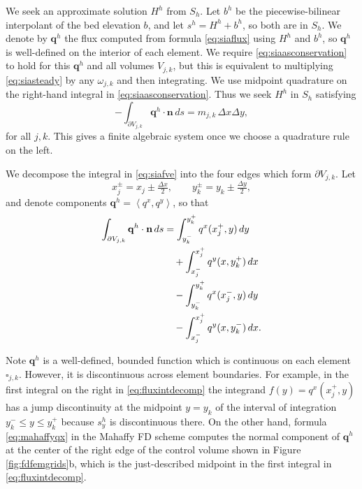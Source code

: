 \documentclass[twocolumn,letterpaper]{igs}
\newcommand\bn{\mathbf{n}}
\newcommand\bq{\mathbf{q}}
\newcommand{\ip}[2]{\ensuremath{\left<#1,#2\right>}}
\newcommand{\dxtwo}{\tfrac{\Delta x}{2}}
\newcommand{\dytwo}{\tfrac{\Delta y}{2}}
\begin{document}
We seek an approximate solution $H^h$ from $S_h$.  Let $b^h$ be the piecewise-bilinear interpolant of the bed elevation $b$, and let $s^h=H^h+b^h$, so both are in $S_h$.  We denote by $\bq^h$ the flux computed from formula \eqref{eq:siaflux} using $H^h$ and $b^h$, so $\bq^h$ is well-defined on the interior of each element.  We require \eqref{eq:siaasconservation} to hold for this $\bq^h$ and all volumes $V_{j,k}$, but this is equivalent to multiplying \eqref{eq:siasteady} by any $\omega_{j,k}$ and then integrating.  We use midpoint quadrature on the right-hand integral in \eqref{eq:siaasconservation}.  Thus we seek $H^h$ in $S_h$ satisfying
\begin{equation}
  - \int_{\partial V_{j,k}} \bq^h \cdot \bn\,ds = m_{j,k}\, \Delta x \Delta y, \label{eq:siafve}
\end{equation}
for all $j,k$.  This gives a finite algebraic system once we choose a quadrature rule on the left.

We decompose the integral in \eqref{eq:siafve} into the four edges which form $\partial V_{j,k}$.  Let
\begin{equation}
x_j^\pm = x_j \pm \dxtwo, \qquad y_k^\pm = y_k \pm \dytwo, \label{eq:definexypm}
\end{equation}
and denote components $\bq^h = \ip{q^x}{q^y}$, so that
\begin{align}
\int_{\partial V_{j,k}} \bq^h \cdot \bn\,ds &= \int_{y_k^-}^{y_k^+} q^x(x_j^+,y)\,dy \label{eq:fluxintdecomp} \\
&\quad + \int_{x_j^-}^{x_j^+} q^y(x,y_k^+)\,dx \notag \\
&\quad - \int_{y_k^-}^{y_k^+} q^x(x_j^-,y)\,dy \notag \\
&\quad - \int_{x_j^-}^{x_j^+} q^y(x,y_k^-)\,dx. \notag
\end{align}

Note $\bq^h$ is a well-defined, bounded function which is continuous on each element $\square_{j,k}$.  However, it is discontinuous across element boundaries.  For example, in the first integral on the right in \eqref{eq:fluxintdecomp} the integrand $f(y) = q^x(x_j^+,y)$ has a jump discontinuity at the midpoint $y=y_k$ of the interval of integration $y_k^- \le y \le y_k^+$ because $s^h_y$ is discontinuous there.  On the other hand, formula \eqref{eq:mahaffyqx} in the Mahaffy FD scheme computes the normal component of $\bq^h$ at the center of the right edge of the control volume shown in Figure \ref{fig:fdfemgrids}b, which is the just-described midpoint in the first integral in \eqref{eq:fluxintdecomp}.
\end{document}
